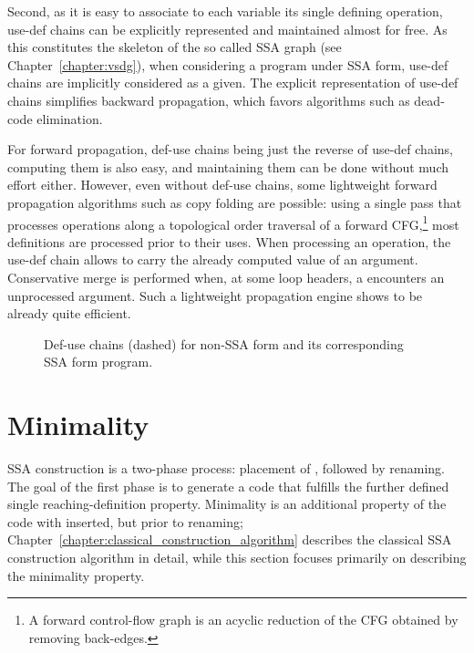 Second, as it is easy to associate to each variable its single defining operation, use-def chains can be explicitly represented and maintained almost for free. As this constitutes the skeleton of the so called SSA graph (see Chapter~\ref{chapter:vsdg}), when considering a program under SSA form, use-def chains are implicitly considered as a given. 
The explicit representation of use-def chains simplifies backward 
propagation, which favors algorithms such as dead-code elimination. 

For forward propagation, def-use chains being just the reverse of use-def chains, computing them is also easy, and maintaining them can be done without much effort either. 
However, even without def-use chains, some lightweight forward propagation algorithms such as copy folding are possible:
using a single pass that processes operations along a topological order traversal of a forward CFG,\footnote{A forward control-flow graph is an acyclic reduction of the CFG obtained by removing back-edges.} most definitions are processed prior to their uses. 
When processing an operation, the use-def chain allows to carry the already computed value of an argument. Conservative merge is performed when, at some loop headers, a \phifun encounters an unprocessed argument.
Such a lightweight  propagation engine shows to be already quite efficient.


\begin{figure}
\caption{Def-use chains (dashed) for non-SSA form and its corresponding SSA form program.}
\label{fig:properties_and_flavors:du} 
\end{figure}



\section{Minimality}
\label{sec:properties_and_flavors:minimality}

SSA construction is a two-phase process: placement of \phifuns,
followed by renaming. The goal of the first phase is to generate a code that fulfills the further defined single reaching-definition property. Minimality is an additional property of the code with 
\phifuns inserted, but prior to renaming; Chapter~\ref{chapter:classical_construction_algorithm} describes the classical SSA
construction algorithm in detail, while this section focuses
primarily on describing the minimality property.


